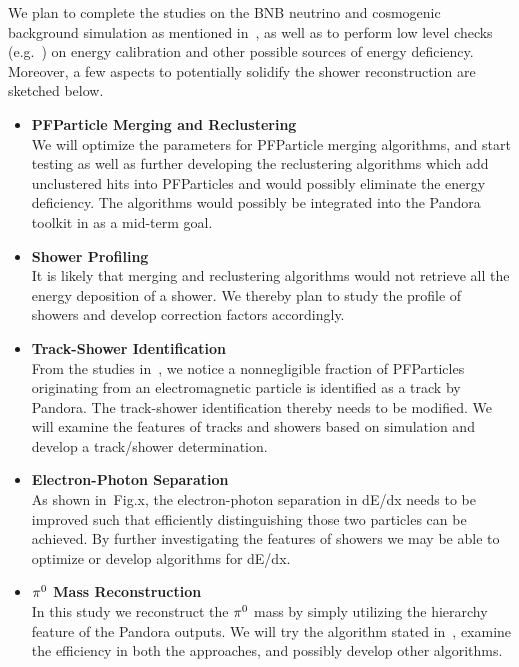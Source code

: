 We plan to complete the studies on the BNB neutrino and cosmogenic
background simulation as mentioned in~,
as well as to perform low level checks (e.g.~\cite{DocDB5814}) 
on energy calibration
and other possible sources of energy deficiency.
Moreover, a few aspects to potentially solidify the shower reconstruction
are sketched below.
\begin{itemize}
\item {\bf PFParticle Merging and Reclustering} \\
We will optimize the parameters for PFParticle merging algorithms,
and start testing as well as further developing the reclustering algorithms
which add unclustered hits into PFParticles and would possibly
eliminate the energy deficiency.
The algorithms would possibly be integrated into the Pandora
toolkit in as a mid-term goal.

\item {\bf Shower Profiling} \\
It is likely that merging and reclustering algorithms would not
retrieve all the energy deposition of a shower.
We thereby plan to study the profile of showers and develop
correction factors accordingly.

\item {\bf Track-Shower Identification} \\
From the studies in~, we notice
a nonnegligible fraction of PFParticles originating from an 
electromagnetic particle is identified as a track by Pandora.
The track-shower identification thereby needs to be modified.
We will examine the features of tracks and showers based on
simulation and develop a track/shower determination.

\item {\bf Electron-Photon Separation} \\
As shown in~Fig.x, the electron-photon separation in
dE/dx needs to be improved such that efficiently distinguishing 
those two particles can be achieved.
By further investigating the features of showers we may be able 
to optimize or develop algorithms for dE/dx.

\item {\bf ${\pi}^0$ Mass Reconstruction} \\
In this study we reconstruct the ${\pi}^0$ mass by
simply utilizing the hierarchy feature of the 
Pandora outputs.
We will try the algorithm stated in~\cite{DocDB5520}, examine
the efficiency in both the approaches, and possibly develop
other algorithms.
\end{itemize}

